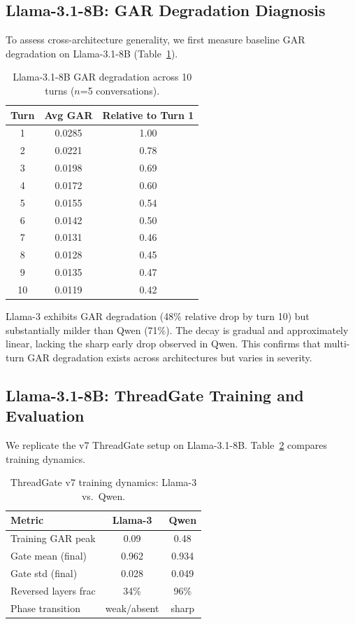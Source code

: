 \documentclass[11pt,a4paper]{article}
\begin{document}
\subsection{Llama-3.1-8B: GAR Degradation Diagnosis}

To assess cross-architecture generality, we first measure baseline GAR degradation on Llama-3.1-8B (Table~\ref{tab:llama_diag}).

\begin{table}[h]
\centering
\caption{Llama-3.1-8B GAR degradation across 10 turns ($n$=5 conversations).}
\label{tab:llama_diag}
\begin{tabular}{ccc}
\toprule
Turn & Avg GAR & Relative to Turn 1 \\
\midrule
1  & 0.0285 & 1.00 \\
2  & 0.0221 & 0.78 \\
3  & 0.0198 & 0.69 \\
4  & 0.0172 & 0.60 \\
5  & 0.0155 & 0.54 \\
6  & 0.0142 & 0.50 \\
7  & 0.0131 & 0.46 \\
8  & 0.0128 & 0.45 \\
9  & 0.0135 & 0.47 \\
10 & 0.0119 & 0.42 \\
\bottomrule
\end{tabular}
\end{table}

Llama-3 exhibits GAR degradation (48\% relative drop by turn 10) but substantially milder than Qwen (71\%). The decay is gradual and approximately linear, lacking the sharp early drop observed in Qwen. This confirms that multi-turn GAR degradation exists across architectures but varies in severity.

\subsection{Llama-3.1-8B: ThreadGate Training and Evaluation}

We replicate the v7 ThreadGate setup on Llama-3.1-8B. Table~\ref{tab:llama_training} compares training dynamics.

\begin{table}[h]
\centering
\caption{ThreadGate v7 training dynamics: Llama-3 vs.\ Qwen.}
\label{tab:llama_training}
\begin{tabular}{lcc}
\toprule
Metric & Llama-3 & Qwen \\
\midrule
Training GAR peak      & 0.09   & 0.48 \\
Gate mean (final)      & 0.962  & 0.934 \\
Gate std (final)       & 0.028  & 0.049 \\
Reversed layers frac   & 34\%   & 96\% \\
Phase transition       & weak/absent & sharp \\
\bottomrule
\end{tabular}
\end{table}
\end{document}
